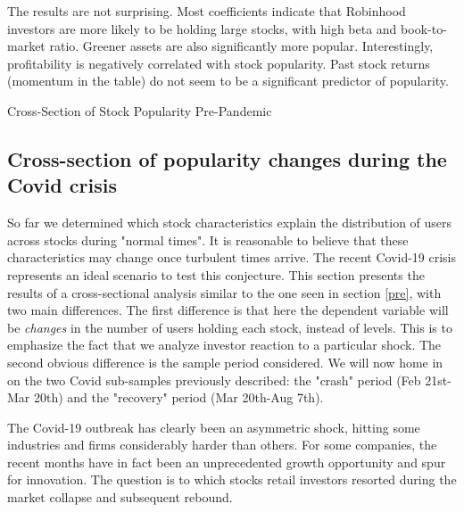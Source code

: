\documentclass[12pt]{article}
\numberwithin{equation}{section} %
\begin{document}
The results are not surprising. Most coefficients indicate that Robinhood investors are more likely to be holding large stocks, with high beta and book-to-market ratio. Greener assets are also significantly more popular. Interestingly, profitability is negatively correlated with stock popularity. Past stock returns (momentum in the table) do not seem to be a significant predictor of popularity.

\begin{table} 
\caption{Cross-Section of Stock Popularity Pre-Pandemic}
 \label{prereg}
\end{table}




\subsection{Cross-section of popularity changes during the Covid crisis} \label{covid}

So far we determined which stock characteristics explain the distribution of users across stocks during "normal times". It is reasonable to believe that these characteristics may change once turbulent times arrive. The recent Covid-19 crisis represents an ideal scenario to test this conjecture. This section presents the results of a cross-sectional analysis similar to the one seen in section \ref{pre}, with two main differences. The first difference is that here the dependent variable will be \emph{changes} in the number of users holding each stock, instead of levels. This is to emphasize the fact that we analyze investor reaction to a particular shock. The second obvious difference is the sample period considered. We will now home in on the two Covid sub-samples previously described: the "crash" period (Feb 21st-Mar 20th) and the "recovery" period (Mar 20th-Aug 7th).

The Covid-19 outbreak has clearly been an asymmetric shock, hitting some industries and firms considerably harder than others. For some companies, the recent months have in fact been an unprecedented growth opportunity and spur for innovation. The question is to which stocks retail investors resorted during the market collapse and subsequent rebound.
\end{document}
